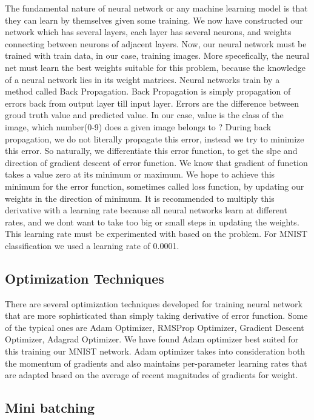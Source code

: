 The fundamental nature of neural network or any machine learning model is that
they can learn by themselves given some training. We now have constructed our
network which has several layers, each layer has several neurons, and weights
connecting between neurons of adjacent layers. Now, our neural network must be
trained with train data, in our case, training images. More specefically, the
neural net must learn the best weights suitable for this problem, because the
knowledge of a neural network lies in its weight matrices. Neural networks
train by a method called Back Propagation.  Back Propagation is simply
propagation of errors back from output layer till input layer. Errors are the
difference between groud truth value and predicted value. In our case, value
is the class of the image, which number(0-9) does a given image belongs to ?
During back propagation, we do not literally propagate this error, instead we
try to minimize this error. So naturally, we differentiate this error
function, to get the slpe and direction of gradient descent of error function.
We know that gradient of function takes a value zero at its minimum or
maximum. We hope to achieve this minimum for the error function, sometimes
called loss function, by updating our weights in the direction of minimum. It
is recommended to multiply this derivative with a learning rate because all
neural networks learn at different rates, and we dont want to take too big or
small steps in updating the weights. This learning rate must be experimented
with based on the problem. For MNIST classification we used a learning rate of
0.0001.



\subsection{Optimization Techniques} 

There are several optimization techniques developed for training neural
network that are more sophisticated than simply taking derivative of error
function. Some of the typical ones are Adam Optimizer, RMSProp Optimizer,
Gradient Descent Optimizer, Adagrad Optimizer. We have found Adam optimizer
best suited for this training our MNIST network. Adam optimizer takes into
consideration both the momentum of gradients and also maintains per-parameter
learning rates that are adapted based on the average of recent magnitudes of
gradients for weight.


\subsection{Mini batching} 

